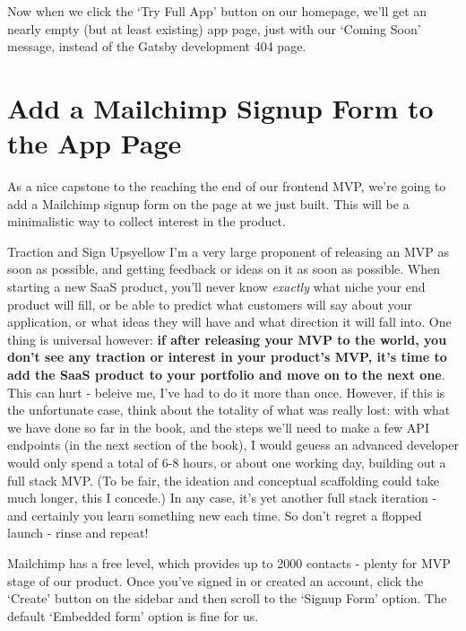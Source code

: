 \documentclass[paper=6in:9in,pagesize=pdftex,headinclude=on,footinclude=on,12pt,twoside]{scrbook}
\begin{document}
Now when we click the `Try Full App' button on our homepage, we'll get an nearly empty (but at least existing) app page, just with our `Coming Soon' message, instead of the Gatsby development 404 page.

\section{Add a Mailchimp Signup Form to the App Page}

As a nice capstone to the reaching the end of our frontend MVP, we're going to add a Mailchimp signup form on the page at  we just built. This will be a minimalistic way to collect interest in the product. 

\begin{highlightBox}{Traction and Sign Ups}{yellow}{\warning}
I'm a very large proponent of releasing an MVP as soon as possible, and getting feedback or ideas on it as soon as possible. When starting a new SaaS product, you'll never know \textit{exactly} what niche your end product will fill, or be able to predict what customers will say about your application, or what ideas they will have and what direction it will fall into. One thing is universal however: \textbf{if after releasing your MVP to the world, you don't see any traction or interest in your product's MVP, it's time to add the SaaS product to your portfolio and move on to the next one}. This can hurt - beleive me, I've had to do it more than once. However, if this is the unfortunate case, think about the totality of what was really lost: with what we have done so far in the book, and the steps we'll need to make a few API endpoints (in the next section of the book), I would geuess an advanced developer would only spend a total of 6-8 hours, or about one working day, building out a full stack MVP. (To be fair, the ideation and conceptual scaffolding could take much longer, this I concede.) In any case, it's yet another full stack iteration - and certainly you learn something new each time. So don't regret a flopped launch - rinse and repeat!
\end{highlightBox}


Mailchimp has a free level, which provides up to 2000 contacts - plenty for MVP stage of our product. Once you've signed in or created an account, click the `Create' button on the sidebar and then scroll to the `Signup Form' option. The default `Embedded form' option is fine for us. 
\end{document}
